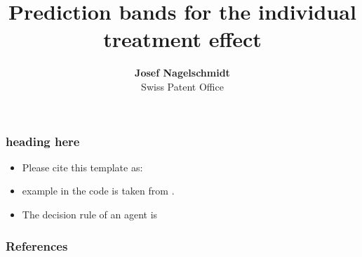 \documentclass[11pt]{beamer}
\begin{document}
\title{Prediction bands for the individual treatment effect}

\author[Josef Nagelschmidt]
{
{\bf Josef Nagelschmidt}\\
{\small Swiss Patent Office}\\[1ex]
}


\begin{frame}
    \titlepage
    \note{~}
\end{frame}


\begin{frame}[t]
    \frametitle{heading here}
    \begin{itemize}
        \item<+-> Please cite this template as: \citet{GaudeckerEconProjectTemplates}
        \item<+-> \citet{Schelling69} example in the code is taken from \citet{StachurskiSargent13}.
        \item<+-> The decision rule of an agent is 
    \end{itemize}
    \note{~}
\end{frame}


 {
    \begin{frame}
        \frametitle{}
    \end{frame}

}

\begin{frame}[allowframebreaks]
    \frametitle{References}

    \renewcommand{\bibfont}{\normalfont\footnotesize}
    \printbibliography

\end{frame}
\end{document}
